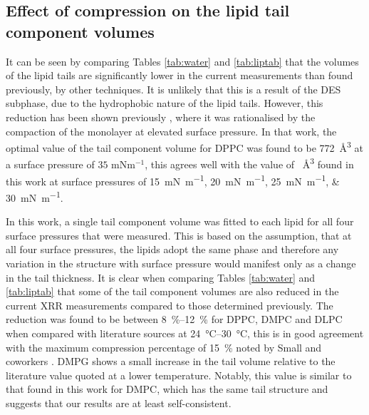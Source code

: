 \documentclass[amsmath,amssymb,twocolumn,superscriptaddress]{revtex4-1}
\begin{document}
\subsection{Effect of compression on the lipid tail component volumes}
%
It can be seen by comparing Tables \ref{tab:water} and \ref{tab:liptab} that the volumes of the lipid tails are significantly lower in the current measurements than found previously, by other techniques.
It is unlikely that this is a result of the DES subphase, due to the hydrophobic nature of the lipid tails.
However, this reduction has been shown previously \cite{campbell_structure_2018}, where it was rationalised by the compaction of the monolayer at elevated surface pressure.
In that work, the optimal value of the tail component volume for DPPC was found to be \SI{772}{\angstrom\cubed} at a surface pressure of $35$ mNm$^{-1}$, this agrees well with the value of ~\si{\angstrom\cubed} found in this work at surface pressures of \SIlist[list-units = single]{15;20;25;30}{\milli\newton\per\meter}.

In this work, a single tail component volume was fitted to each lipid for all four surface pressures that were measured.
This is based on the assumption, that at all four surface pressures, the lipids adopt the same phase and therefore any variation in the structure with surface pressure would manifest only as a change in the tail thickness.
It is clear when comparing Tables \ref{tab:water} and \ref{tab:liptab} that some of the tail component volumes are also reduced in the current XRR measurements compared to those determined previously.
The reduction was found to be between \SIrange{8}{12}{\percent} for DPPC, DMPC and DLPC when compared with literature sources at \SIrange{24}{30}{\celsius}, this is in good agreement with the maximum compression percentage of \SI{15}{\percent} noted by Small and coworkers \cite{small_lateral_1984}.
DMPG shows a small increase in the tail volume relative to the literature value quoted at a lower temperature.
Notably, this value is similar to that found in this work for DMPC, which has the same tail structure and suggests that our results are at least self-consistent.
\end{document}
